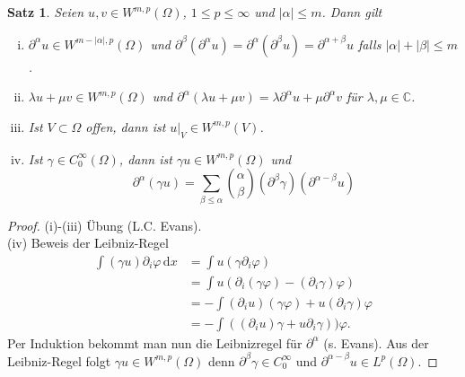 \documentclass[
paper=a4,
bibtotocnumbered,
liststotocnumbered,
tablecaptionabove,
pointlessnumbers,
twoside,
openright,
10pt
]
{report}
\let\phi\varphi
\newtheorem{satz}[thm]{Satz}
\theoremstyle{definition}
\numberwithin{equation}{chapter}
\begin{document}
\begin{satz}
Seien $u,v\in W^{m,p}(\Omega)$, $1\le p \le \infty$ und $|\alpha |\le m$. Dann gilt
\begin{enumerate}[i)]
\item $\partial^\alpha u\in W^{m-|\alpha|, p}(\Omega)$ und $\partial^\beta(\partial^\alpha u) = \partial^\alpha (\partial^\beta u) = \partial^{\alpha + \beta} u$ falls $|\alpha|+|\beta|\le m$.
\item $\lambda u + \mu v\in W^{m,p}(\Omega)$ und $\partial^\alpha (\lambda u + \mu v)= \lambda \partial^\alpha u + \mu \partial^\alpha v$ für $\lambda, \mu \in \mathbb C$.
\item Ist $V \subset \Omega$ offen, dann ist $u|_V \in W^{m,p}(V)$. 
\item Ist $\gamma \in C_0^\infty(\Omega)$, dann ist $\gamma u \in W^{m,p}(\Omega)$ und
$$
\partial^\alpha (\gamma u) = \sum_{\beta \le \alpha} \binom{\alpha}{\beta} (\partial^\beta \gamma) ( \partial^{\alpha-\beta}u)
$$ 
\end{enumerate}
\end{satz}
\begin{proof}
(i)-(iii) Übung (L.C. Evans).\\
(iv) Beweis der  Leibniz-Regel
\begin{align*}
\int(\gamma u) \partial_i \phi \, \mathrm dx &= \int u (\gamma \partial_i \phi) \\
&= \int u (\partial_i (\gamma \phi) - (\partial_i \gamma) \phi) \\
&= - \int (\partial_i u) (\gamma \phi) + u(\partial_i \gamma) \phi \\
&= - \int ((\partial_i u) \gamma + u\partial_i \gamma)) \phi.
\end{align*}
Per Induktion bekommt man nun die Leibnizregel für $\partial^\alpha$ (s. Evans).
Aus der Leibniz-Regel folgt $\gamma u \in W^{m,p}(\Omega)$ denn $\partial^\beta \gamma\in C_0^\infty$ und $\partial^{\alpha-\beta}u \in L^p(\Omega)$.
\end{proof}
\end{document}
